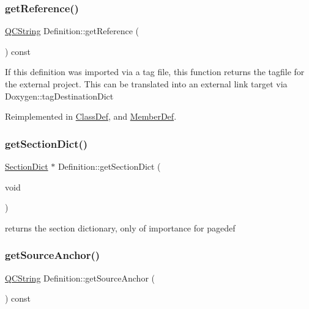 \mbox{\label{class_definition_a0186c1c36a52590d2c7c9157aaea613f}} 
\subsubsection{\texorpdfstring{getReference()}{getReference()}}
{\footnotesize\ttfamily \mbox{\hyperlink{class_q_c_string}{Q\+C\+String}} Definition\+::get\+Reference (\begin{DoxyParamCaption}{ }\end{DoxyParamCaption}) const\hspace{0.3cm}{\ttfamily [virtual]}}

If this definition was imported via a tag file, this function returns the tagfile for the external project. This can be translated into an external link target via Doxygen\+::tag\+Destination\+Dict 

Reimplemented in \mbox{\hyperlink{class_class_def_aa19a0146566892e3f947698762d6e3e8}{Class\+Def}}, and \mbox{\hyperlink{class_member_def_a96b40b99dcb42feaf5cb9de1bf784f0f}{Member\+Def}}.

\mbox{\label{class_definition_a6e1082b554fd3077ad96455c7bacf20e}} 
\subsubsection{\texorpdfstring{getSectionDict()}{getSectionDict()}}
{\footnotesize\ttfamily \mbox{\hyperlink{class_section_dict}{Section\+Dict}} $\ast$ Definition\+::get\+Section\+Dict (\begin{DoxyParamCaption}\item[{void}]{ }\end{DoxyParamCaption})}

returns the section dictionary, only of importance for pagedef \mbox{\label{class_definition_a7199d0a6628c0883e5797f6b2f9f634c}} 
\subsubsection{\texorpdfstring{getSourceAnchor()}{getSourceAnchor()}}
{\footnotesize\ttfamily \mbox{\hyperlink{class_q_c_string}{Q\+C\+String}} Definition\+::get\+Source\+Anchor (\begin{DoxyParamCaption}{ }\end{DoxyParamCaption}) const\hspace{0.3cm}{\ttfamily [virtual]}}


